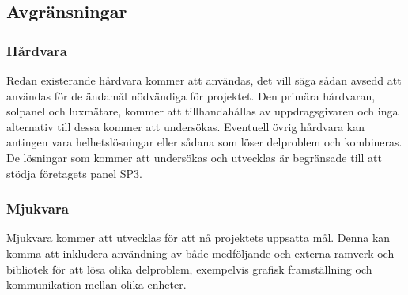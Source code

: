     \subsection{Avgränsningar} %
    \label{sub:avgr_nsningar}
        \subsubsection{Hårdvara} %
        \label{ssub:h_rdvara}
            Redan existerande hårdvara kommer att användas, det vill säga sådan avsedd att användas för de ändamål nödvändiga för projektet. 
            Den primära hårdvaran, solpanel och luxmätare, kommer att tillhandahållas av uppdragsgivaren och inga alternativ till dessa kommer att undersökas. 
            Eventuell övrig hårdvara kan antingen vara helhetslösningar eller sådana som löser delproblem och kombineras. 
            De lösningar som kommer att undersökas och utvecklas är begränsade till att stödja företagets panel SP3.

        \subsubsection{Mjukvara} %
        \label{ssub:mjukvara}
            Mjukvara kommer att utvecklas för att nå projektets uppsatta mål. 
            Denna kan komma att inkludera användning av både medföljande och externa ramverk och bibliotek för att lösa olika delproblem, exempelvis grafisk framställning och kommunikation mellan olika enheter.


